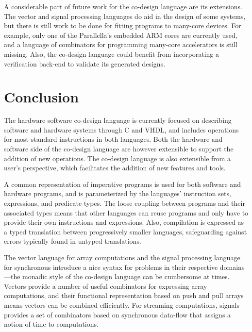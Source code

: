 \documentclass[../paper.tex]{subfiles}
\begin{document}
A considerable part of future work for the co-design language are its extensions. The vector and signal processing languages do aid in the design of some systems, but there is still work to be done for fitting programs to many-core devices. For example, only one of the Parallella's embedded ARM cores are currently used, and a language of combinators for programming many-core accelerators is still missing. Also, the co-design language could benefit from incorporating a verification back-end to validate its generated designs.

\section{Conclusion}
\label{conc}

The hardware software co-design language is currently focused on describing software and hardware systems through C and VHDL, and includes operations for most standard instructions in both languages. Both the hardware and software side of the co-design language are however extensible to support the addition of new operations. The co-design language is also extensible from a user's perspective, which facilitates the addition of new features and tools.

A common representation of imperative programs is used for both software and hardware programs, and is parameterized by the languages' instruction sets, expressions, and predicate types. The loose coupling between programs and their associated types means that other languages can reuse programs and only have to provide their own instructions and expressions. Also, compilation is expressed as a typed translation between progressively smaller languages, safeguarding against errors typically found in untyped translations.

The vector language for array computations and the signal processing language for synchronous introduce a nice syntax for problems in their respective domains---the monadic style of the co-design language can be cumbersome at times. Vectors provide a number of useful combinators for expressing array computations, and their functional representation based on push and pull arrays means vectors can be combined efficiently. For streaming computations, signals provides a set of combinators based on synchronous data-flow that assigns a notion of time to computations.
\end{document}
